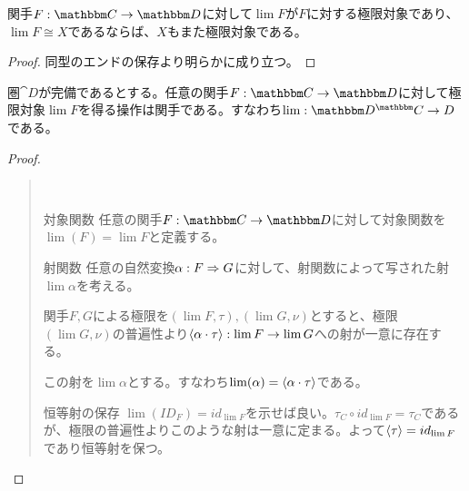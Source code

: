 \begin{prop}[同型の極限の保存]
  関手$\functor{F}{C}{D}$に対して$\lim F$が$F$に対する極限対象であり、$\lim F\cong X$であるならば、$X$もまた極限対象である。
\end{prop}
\begin{proof}
  同型のエンドの保存より明らかに成り立つ。
\end{proof}
\begin{prop}[極限の関手性]\label{prop-limit-is-functor}
  圏$\cat{D}$が完備であるとする。任意の関手$\functor{F}{C}{D}$に対して極限対象$\lim F$を得る操作は関手である。すなわち$\mor{\lim}{\funccat{C}{D}}{D}$である。
\end{prop}
\begin{proof}
  \begin{quote}~
    \begin{mydescription}
      \item[対象関数] 任意の関手$\functor{F}{C}{D}$に対して対象関数を$\lim(F) = \lim F$と定義する。
      \item[射関数] 
      任意の自然変換$\alpha:F\Rightarrow G$に対して、射関数によって写された射$\lim \alpha$を考える。

      関手$F,G$による極限を$(\lim F, \tau),(\lim G, \nu)$とすると、極限$(\lim G, \nu)$の普遍性より$\langle \alpha\cdot\tau\rangle:\lim F\rightarrow \lim G$への射が一意に存在する。
      \begin{center}
      \end{center}
      この射を$\lim\alpha$とする。すなわち$\lim(\alpha)=\langle \alpha\cdot\tau\rangle$である。
      \item[恒等射の保存] $\lim(ID_F)=id_{\lim F}$を示せば良い。$\tau_C\circ id_{\lim F} = \tau_C$であるが、極限の普遍性よりこのような射は一意に定まる。よって$\langle \tau\rangle=id_{\lim F}$であり恒等射を保つ。
      \begin{center}
\end{center}
\end{mydescription}
\end{quote}
\end{proof}
